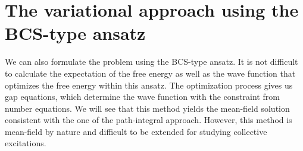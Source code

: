 \chapter{The variational approach  using  the BCS-type ansatz\label{ch:mean}}
We can also formulate the problem  using the  BCS-type ansatz.  It is not difficult to calculate  the expectation of the free energy as well as  the wave function that optimizes the free energy within this ansatz.  The optimization process gives us gap equations, which determine the  wave function with the constraint from number equations.   %
We will see that this method yields  the mean-field solution consistent with the one of the path-integral approach.  However, this method is mean-field by nature and  difficult  to be extended for studying collective excitations.  

